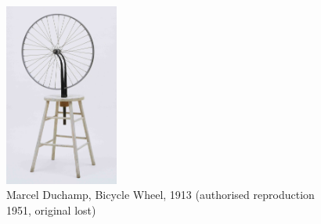 \begin{figure}[h!]
  \centering
  \includegraphics[height=6cm]{graphics/duchamp-bicycle-wheel-1913.jpg}
  \caption{Marcel Duchamp, Bicycle Wheel, 1913 (authorised reproduction 1951, original lost)}
  \label{fig:Duchamp_BicycleWheel}
\end{figure}







